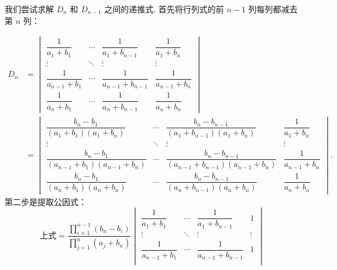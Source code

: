 \begin{solution}
    我们尝试求解 $D_n$ 和 $D_{n-1}$ 之间的递推式. 首先将行列式的前 $n-1$ 列每列都减去第 $n$ 列：

    \begin{align*}
        D_n & = \begin{vmatrix}
                    \dfrac{1}{a_1+b_1}     & \cdots & \dfrac{1}{a_1+b_{n-1}}     & \dfrac{1}{a_1+b_n}     \\[2ex]
                    \vdots                 & \ddots & \vdots                     & \vdots                 \\[2ex]
                    \dfrac{1}{a_{n-1}+b_1} & \cdots & \dfrac{1}{a_{n-1}+b_{n-1}} & \dfrac{1}{a_{n-1}+b_n} \\[2ex]
                    \dfrac{1}{a_n+b_1}     & \cdots & \dfrac{1}{a_n+b_{n-1}}     & \dfrac{1}{a_n+b_n}
                \end{vmatrix}                                                                       \\[2ex]
            & = \begin{vmatrix}
                    \dfrac{b_n-b_1}{(a_1+b_1)(a_1+b_n)}         & \cdots & \dfrac{b_n-b_{n-1}}{(a_1+b_{n-1})(a_1+b_n)}         & \dfrac{1}{a_1+b_n}     \\[2ex]
                    \vdots                                      & \ddots & \vdots                                              & \vdots                 \\[2ex]
                    \dfrac{b_n-b_1}{(a_{n-1}+b_1)(a_{n-1}+b_n)} & \cdots & \dfrac{b_n-b_{n-1}}{(a_{n-1}+b_{n-1})(a_{n-1}+b_n)} & \dfrac{1}{a_{n-1}+b_n} \\[2ex]
                    \dfrac{b_n-b_1}{(a_n+b_1)(a_n+b_n)}         & \cdots & \dfrac{b_n-b_{n-1}}{(a_n+b_{n-1})(a_n+b_n)}         & \dfrac{1}{a_n+b_n}
                \end{vmatrix}.
    \end{align*}
    第二步是提取公因式：
    \[ \text{上式} = \dfrac{\prod\limits_{i=1}^{n-1}(b_n-b_i)}{\prod\limits_{j=1}^{n}(a_j+b_n)}
        \begin{vmatrix}
            \dfrac{1}{a_1+b_1}     & \cdots & \dfrac{1}{a_1+b_{n-1}}     & 1      \\[2ex]
            \vdots                 & \ddots & \vdots                     & \vdots \\[2ex]
            \dfrac{1}{a_{n-1}+b_1} & \cdots & \dfrac{1}{a_{n-1}+b_{n-1}} & 1      \\[2ex]

\end{vmatrix}\]
\end{solution}
